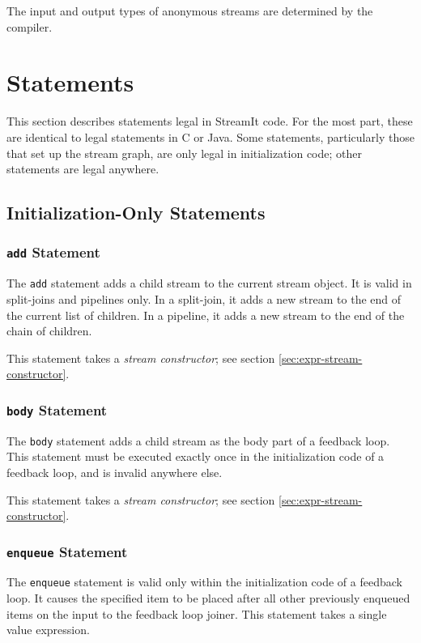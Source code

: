 \documentclass[11pt]{article}
\begin{document}
The input and output types of anonymous streams are determined by the
compiler.

\section{Statements}

This section describes statements legal in StreamIt code.  For the
most part, these are identical to legal statements in C or Java.  Some
statements, particularly those that set up the stream graph, are only
legal in initialization code; other statements are legal anywhere.

\subsection{Initialization-Only Statements}

\subsubsection{\lstinline|add| Statement}

The \lstinline|add| statement adds a child stream to the current stream
object.  It is valid in split-joins and pipelines only.  In a
split-join, it adds a new stream to the end of the current list of
children.  In a pipeline, it adds a new stream to the end of the chain
of children.

This statement takes a \emph{stream constructor}; see section
\ref{sec:expr-stream-constructor}.

\subsubsection{\lstinline|body| Statement}

The \lstinline|body| statement adds a child stream as the body part of
a feedback loop.  This statement must be executed exactly once in the
initialization code of a feedback loop, and is invalid anywhere else.

This statement takes a \emph{stream constructor}; see section
\ref{sec:expr-stream-constructor}.

\subsubsection{\lstinline|enqueue| Statement}

The \lstinline|enqueue| statement is valid only within the
initialization code of a feedback loop.  It causes the specified item
to be placed after all other previously enqueued items on the input to
the feedback loop joiner.  This statement takes a single value
expression.
\end{document}
